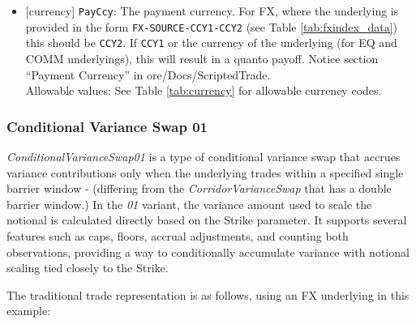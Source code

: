 \begin{itemize}
  no knock-out occurs. If the barrier is knock-in, this represents the settlement date, which is the final
  valuation date plus the settlement lag. \\
  Allowable values: See section \ref{ss:schedule_data} Schedule Data and Dates, or DerivedSchedule (see the scripted trade documentation in ore/Docs/ScriptedTrade).
  \item{}[currency] \lstinline!PayCcy!: The payment currency. For FX, where the underlying is provided
      in the form \lstinline!FX-SOURCE-CCY1-CCY2! (see Table \ref{tab:fxindex_data}) this should
      be \lstinline!CCY2!. If \lstinline!CCY1! or the currency of the underlying (for EQ and
      COMM underlyings), this will result in a quanto payoff. Notice section ``Payment Currency'' in ore/Docs/ScriptedTrade. \\
        Allowable values: See Table \ref{tab:currency}  for allowable currency codes.
\end{itemize}

\subsubsection{Conditional Variance Swap 01}

\emph{ConditionalVarianceSwap01} is a type of conditional variance swap that accrues variance contributions only when the underlying trades within a
specified single barrier window - (differing from the \emph{CorridorVarianceSwap} that has a double barrier window.) In the \emph{01} variant, the variance amount used to scale the notional is calculated directly based on the Strike parameter.
It supports several features such as caps, floors, accrual adjustments, and counting both observations, providing a way to conditionally accumulate
variance with notional scaling tied closely to the Strike.

The traditional trade representation is as follows, using an FX underlying in this example:

